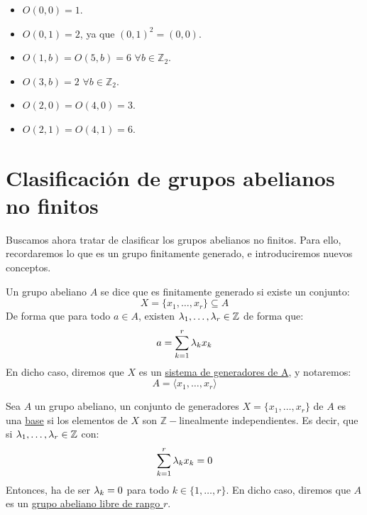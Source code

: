 \begin{ejemplo}
\begin{itemize}
            \begin{itemize}
                \item $O(0,0) = 1$.
                \item $O(0,1) = 2$, ya que ${(0,1)}^{2} = (0,0)$.
                \item $O(1,b) = O(5,b) = 6$ $\forall b\in \mathbb{Z}_2$.
                \item $O(3, b) = 2$ $\forall b\in \mathbb{Z}_2$.
                \item $O(2, 0) = O(4, 0) = 3$.
                \item $O(2, 1) = O(4, 1) = 6$.
            \end{itemize}
    \end{itemize}
\end{ejemplo}

\section{Clasificación de grupos abelianos no finitos}
\noindent
Buscamos ahora tratar de clasificar los grupos abelianos no finitos. Para ello, recordaremos lo que es un grupo finitamente generado, e introduciremos nuevos conceptos.

\begin{definicion}
    Un grupo abeliano $A$ se dice que es finitamente generado si existe un conjunto:
    \begin{equation*}
        X = \{x_1,\ldots,x_r\} \subseteq A
    \end{equation*}
    De forma que para todo $a\in A$, existen $\lambda_1, \ldots, \lambda_r \in \mathbb{Z}$ de forma que:
    \begin{equation*}
        a = \sum_{k=1}^{r} \lambda_k x_k
    \end{equation*}
    En dicho caso, diremos que $X$ es un \underline{sistema de generadores de A}, y notaremos:
    \begin{equation*}
        A = \langle x_1, \ldots, x_r \rangle 
    \end{equation*}
\end{definicion}

\begin{definicion}[Base]
Sea $A$ un grupo abeliano, un conjunto de generadores $X = \{x_1,\ldots,x_r\}$ de $A$ es una \underline{base} si los elementos de $X$ son $\mathbb{Z}-$linealmente independientes. Es decir, que si $\lambda_1,\ldots,\lambda_r\in \mathbb{Z}$ con:
\begin{equation*}
    \sum_{k=1}^{r}\lambda_k x_k = 0
\end{equation*}
Entonces, ha de ser $\lambda_k = 0$ para todo $k\in \{1,\ldots,r\}$. En dicho caso, diremos que $A$ es un \underline{grupo abeliano libre de rango $r$}.
\end{definicion}

